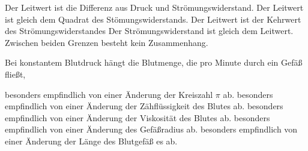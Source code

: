 \documentclass[11pt]{exam}
\begin{document}
\begin{questions}
\begin{choices}
	\choice Der Leitwert ist die Differenz aus Druck und Strömungswiderstand.
	\choice Der Leitwert ist gleich dem Quadrat des Stömungswiderstands.
	\choice Der Leitwert ist der Kehrwert des Strömungswiderstandes
	\choice Der Strömungswiderstand ist gleich dem Leitwert.
	\choice Zwischen beiden Grenzen besteht kein Zusammenhang.
\end{choices}

\vspace{3mm}\question Bei konstantem Blutdruck hängt die Blutmenge, die pro Minute durch ein Gefäß fließt,

\begin{choices}
	\choice besonders empfindlich von einer Änderung der Kreiszahl \(\pi\) ab.
	\choice besonders empfindlich von einer Änderung der Zähflüssigkeit des Blutes ab.
	\choice besonders empfindlich von einer Änderung der Viskosität des Blutes ab.
	\choice besonders empfindlich von einer Änderung des Gefäßradius ab.
	\choice besonders empfindlich von einer Änderung der Länge des Blutgefäß es ab.
\end{choices}

\vspace{3mm}\end{questions}
\end{document}
